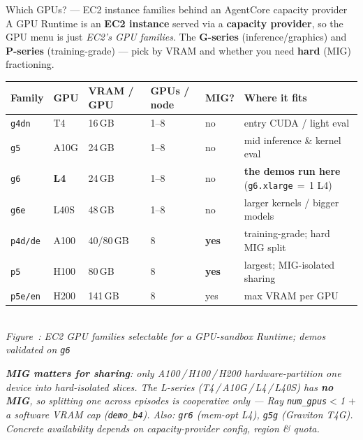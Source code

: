 \documentclass[aspectratio=169]{beamer}
\newcounter{deckfig}
\newcommand{\figtag}[1]{\refstepcounter{deckfig}%
  {\scriptsize\itshape Figure~\thedeckfig: #1}}
\begin{document}
\begin{frame}{Which GPUs? --- EC2 instance families behind an AgentCore capacity provider}
  \footnotesize A GPU Runtime is an \textbf{EC2 instance} served via a \textbf{capacity provider}, so the
  GPU menu is just \emph{EC2's GPU families}. The \textbf{G-series} (inference/graphics) and
  \textbf{P-series} (training-grade) --- pick by VRAM and whether you need \textbf{hard} (MIG) fractioning.
  \begin{center}
  \renewcommand{\arraystretch}{0.55}\scriptsize
  \begin{tabular}{@{}p{1.35cm}p{1.5cm}p{1.5cm}p{1.35cm}p{1.05cm}p{3.9cm}@{}}
    \toprule
    \textbf{Family} & \textbf{GPU} & \textbf{VRAM / GPU} & \textbf{GPUs / node} & \textbf{MIG?} & \textbf{Where it fits} \\
    \midrule
    \texttt{g4dn} & T4 & 16\,GB & 1--8 & no & entry CUDA / light eval \\
    \texttt{g5} & A10G & 24\,GB & 1--8 & no & mid inference \& kernel eval \\
    \texttt{g6} & \textbf{L4} & 24\,GB & 1--8 & no & \textbf{the demos run here} (\texttt{g6.xlarge}\,$=$\,1 L4) \\
    \texttt{g6e} & L40S & 48\,GB & 1--8 & no & larger kernels / bigger models \\
    \midrule
    \texttt{p4d/de} & A100 & 40/80\,GB & 8 & \textbf{yes} & training-grade; hard MIG split \\
    \texttt{p5} & H100 & 80\,GB & 8 & \textbf{yes} & largest; MIG-isolated sharing \\
    \texttt{p5e/en} & H200 & 141\,GB & 8 & yes & max VRAM per GPU \\
    \bottomrule
  \end{tabular}
  \\\figtag{EC2 GPU families selectable for a GPU-sandbox Runtime; demos validated on \texttt{g6}}
  \end{center}
  \vspace{-0.1em}
  {\scriptsize\itshape \textbf{MIG matters for sharing}: only A100\,/\,H100\,/\,H200 hardware-partition one
  device into \emph{hard-isolated} slices. The L-series (T4\,/\,A10G\,/\,L4\,/\,L40S) has \textbf{no MIG},
  so splitting one across episodes is \emph{cooperative} only --- Ray \texttt{num\_gpus}$<$1 $+$ a software
  VRAM cap (\texttt{demo\_b4}). Also: \texttt{gr6} (mem-opt L4), \texttt{g5g} (Graviton T4G).
  Concrete availability depends on capacity-provider config, region \& quota.}
\end{frame}
\end{document}
